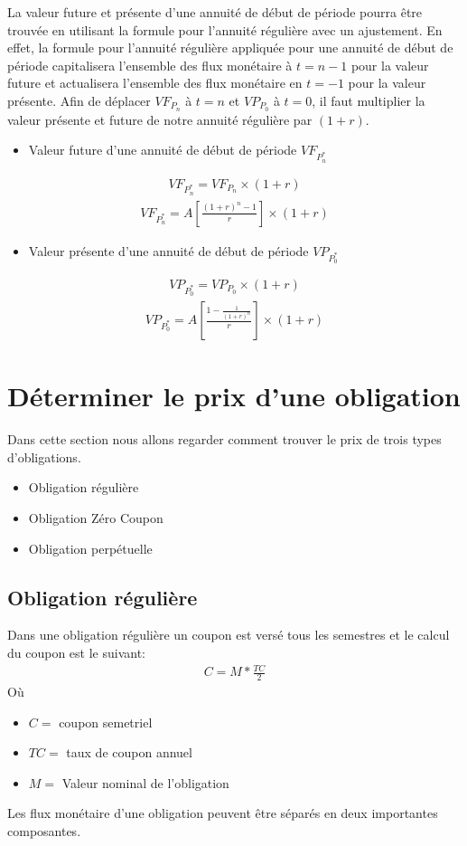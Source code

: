\documentclass[12pt]{article}
\begin{document}
La valeur future et présente d'une annuité de début de période pourra être trouvée en utilisant la formule pour l'annuité régulière avec un ajustement. En effet, la formule pour l'annuité régulière appliquée pour une annuité de début de période capitalisera l'ensemble des flux monétaire à $t=n-1$ pour la valeur future et actualisera l'ensemble des flux monétaire en $t=-1$ pour la valeur présente. Afin de déplacer $VF_{P_n}$ à $t=n$ et $VP_{P_0}$ à $t=0$, il faut multiplier la valeur présente et future de notre annuité régulière par $(1+r)$.

\begin{itemize}
\item Valeur future d'une annuité de début de période $VF_{P_n^*}$
\end{itemize}
\begin{align*}
VF_{P_n^*}=VF_{P_n} \times (1+r)
\end{align*}
\begin{align*}
VF_{P_n^*}=A \left[\frac{(1+r)^n-1}{r} \right] \times (1+r)
\end{align*}

\begin{itemize}
\item Valeur présente d'une annuité de début de période $VP_{P_0^*}$
\end{itemize}
\begin{align*}
VP_{P_0^*}=VP_{P_0} \times (1+r)
\end{align*}
\begin{align*}
VP_{P_0^*}=A \left[ \frac{1-\frac{1}{(1+r)^n}}{r} \right] \times (1+r)
\end{align*}

\newpage
\section{Déterminer le prix d'une obligation}
Dans cette section nous allons regarder comment trouver le prix de trois types d'obligations.
\begin{itemize}
\item Obligation régulière 
\item Obligation Zéro Coupon
\item Obligation perpétuelle
\end{itemize}

\subsection{Obligation régulière}
Dans une obligation régulière un coupon est versé tous les semestres et le calcul du coupon est le suivant:
\begin{align*}
C= M * \frac{TC}{2}
\end{align*}
Où 
\begin{itemize}
\item $C=$ coupon semetriel 
\item $TC=$ taux de coupon annuel 
\item $M=$ Valeur nominal de l'obligation 
\end{itemize}
\vspace{1cm}
Les flux monétaire d'une obligation peuvent être séparés en deux importantes composantes. 
\end{document}
